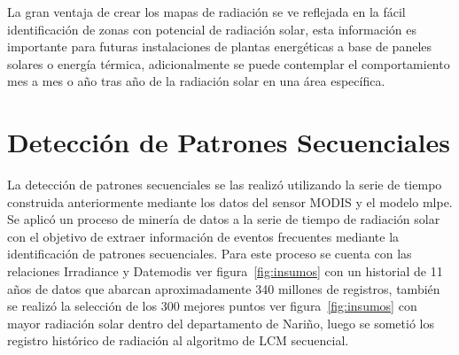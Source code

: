 La gran ventaja de crear los mapas de radiación se ve reflejada en la fácil identificación de zonas con potencial de radiación solar, esta información es importante 
para futuras instalaciones de plantas energéticas a base de paneles solares o energía térmica, adicionalmente se puede contemplar el comportamiento mes a mes o año 
tras año de la radiación solar en una área específica.


\section{Detección de Patrones Secuenciales}

La detección de patrones secuenciales se las realizó utilizando la serie de tiempo construida anteriormente mediante los datos del sensor MODIS y el modelo mlpe.
Se aplicó un proceso de minería de datos a la serie de tiempo de radiación solar con el objetivo de extraer información de eventos frecuentes mediante 
la identificación de patrones secuenciales. Para este proceso se cuenta con las relaciones Irradiance y Datemodis ver figura~\ref{fig:insumos} con un historial 
de 11 años de datos que abarcan aproximadamente 340 millones de registros, también se realizó la selección de los 300 mejores puntos 
ver figura~\ref{fig:insumos} con mayor radiación solar dentro del departamento de Nariño, luego se sometió los registro 
histórico de radiación al algoritmo de LCM secuencial. 
